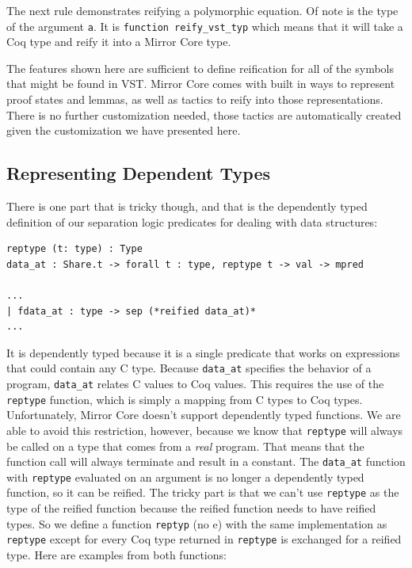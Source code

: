 \documentclass{puthesis}
\begin{document}
The next rule demonstrates reifying a polymorphic equation. Of note is
the type of the argument \lstinline|a|. It is 
\lstinline|function reify_vst_typ| which means that it will take a Coq type and reify it
into a Mirror Core type.

The features shown here are sufficient to define reification for all
of the symbols that might be found in VST. Mirror Core comes with
built in ways to represent proof states and lemmas, as well as tactics
to reify into those representations. There is no further customization
needed, those tactics are automatically created given the
customization we have presented here. 

\subsection{Representing Dependent Types}

There is one part that is tricky though, and that is the dependently
typed definition of our separation logic predicates for dealing with
data structures:

\begin{lstlisting}
reptype (t: type) : Type
data_at : Share.t -> forall t : type, reptype t -> val -> mpred

...
| fdata_at : type -> sep (*reified data_at)*
...
\end{lstlisting}

It is dependently typed because it is a single predicate that works on
expressions that could contain any C type. Because \lstinline|data_at|
specifies the behavior of a program, \lstinline|data_at| relates C
values to Coq values. This requires the use of the \lstinline|reptype|
function, which is simply a mapping from C types to Coq
types. Unfortunately, Mirror Core doesn't support dependently typed
functions. We are able to avoid this restriction, however, because we
know that \lstinline|reptype| will always be called on a type that
comes from a \emph{real} program. That means that the function call
will always terminate and result in a constant. The \lstinline|data_at|
function with \lstinline|reptype| evaluated on an argument is no
longer a dependently typed function, so it can be reified. The tricky
part is that we can't use \lstinline|reptype| as the type of the
reified function because the reified function needs to have reified
types. So we define a function \lstinline|reptyp| (no e) with the same
implementation as \lstinline|reptype| except for every Coq type
returned in \lstinline|reptype| is exchanged for a reified
type. Here are examples from both functions:
\end{document}

